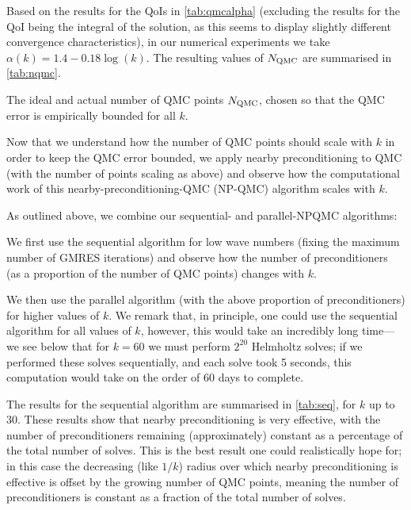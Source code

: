 Based on the results for the QoIs in \cref{tab:qmcalpha} (excluding the results for the QoI being the integral of the solution, as this seems to display slightly different convergence characteristics), in our numerical experiments we take $\alpha(k) = 1.4 - 0.18 \log(k).$ The resulting values of $N_{\mathrm{QMC}}$ are summarised in \cref{tab:nqmc}.

\begin{table}[h]
  \centering
  
  \caption{The ideal and actual number of QMC points $N_{\mathrm{QMC}}$, chosen so that the QMC error is empirically bounded for all $k$.}\label{tab:qmcpoints}
  \end{table}

Now that we understand how the number of QMC points should scale with $k$ in order to keep the QMC error bounded, we apply nearby preconditioning to QMC (with the number of points scaling as above) and observe how the computational work of this nearby-preconditioning-QMC (NP-QMC) algorithm scales with $k.$

As outlined above, we combine our sequential- and parallel-NPQMC algorithms:
\bit
\item We first use the sequential algorithm for low wave numbers (fixing the maximum number of GMRES iterations) and observe how the number of preconditioners (as a proportion of the number of QMC points) changes with $k$.
  \item We then use the parallel algorithm (with the above proportion of preconditioners) for higher values of $k.$
    \eit
    We remark that, in principle, one could use the sequential algorithm for all values of $k$, however, this would take an incredibly long time--- we see below that for $k=60$ we must perform $2^{20}$ Helmholtz solves; if we performed these solves sequentially, and each solve took 5 seconds, this computation would take on the order of 60 days to complete.

    The results for the sequential algorithm are summarised in \cref{tab:seq}, for $k$ up to 30. These results show that nearby preconditioning is very effective, with the number of preconditioners remaining (approximately) constant as a percentage of the total number of solves. This is the best result one could realistically hope for; in this case the decreasing (like $1/k$) radius over which nearby preconditioning is effective is offset by the growing number of QMC points, meaning the number of preconditioners is constant as a fraction of the total number of solves.

